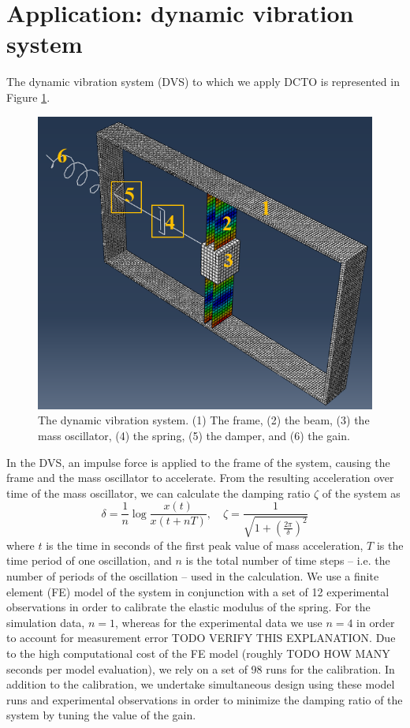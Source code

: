 \documentclass[12pt]{article}
\begin{document}
\section{Application: dynamic vibration system}
%
The dynamic vibration system (DVS) to which we apply DCTO is represented in Figure \ref{fig:dvs}.
%
\begin{figure}
	\centering
	\includegraphics[scale=0.85]{FIG_dvs_illustration}
	\captionsetup{width=.85\linewidth}
	\caption{The dynamic vibration system. (1) The frame, (2) the beam, (3) the mass oscillator, (4) the spring, (5) the damper, and (6) the gain.}
	\label{fig:dvs}
\end{figure}
%
In the DVS, an impulse force is applied to the frame of the system, causing the frame and the mass oscillator to accelerate.
%
From the resulting acceleration over time of the mass oscillator, we can calculate the damping ratio $\zeta$ of the system as
\[
\delta = \frac1n \log\frac{x(t)}{x(t+nT)},\quad \zeta = \frac1{\sqrt{1+\left(\frac{2\pi}{\delta}\right)^2}}
\]
%
where $t$ is the time in seconds of the first peak value of mass acceleration, $T$ is the time period of one oscillation, and $n$ is the total number of time steps -- i.e. the number of periods of the oscillation -- used in the calculation.
%
We use a finite element (FE) model of the system in conjunction with a set of 12 experimental observations in order to calibrate the elastic modulus of the spring.
%
For the simulation data, $n=1$, whereas for the experimental data we use $n=4$ in order to account for measurement error TODO VERIFY THIS EXPLANATION.
%
Due to the high computational cost of the FE model (roughly TODO HOW MANY seconds per model evaluation), we rely on a set of 98 runs for the calibration.
%
In addition to the calibration, we undertake simultaneous design using these model runs and experimental observations in order to minimize the damping ratio of the system by tuning the value of the gain.
%
\end{document}
